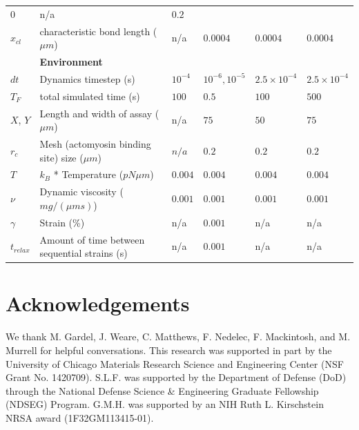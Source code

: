 \documentclass[12pt]{article} \usepackage{times} \usepackage{graphicx}
\begin{document}
\begin{table}
\begin{tabular}{|C{1cm}|L{6cm}|C{2cm}|C{2cm}|C{2cm}|C{2cm}|}
    0 & n/a&$0.2$\\ $x_{cl}$& characteristic bond length ($\mu m$) & n/a &
    $0.0004$ & $0.0004$ & $0.0004$ \\ \hline &\bf{Environment} & & \\ \hline
    $dt$ & Dynamics timestep (s) & $10^{-4}$ & $10^{-6},10^{-5}$
    &$2.5\times10^{-4}$ &$2.5\times10^{-4}$ \\ $T_F$& total simulated time (s)
    & $100$ & $0.5$ & $100$ & $500$ \\ $X$, $Y$ & Length and width of assay
    ($\mu m$)& n/a & $75$ & $50$ & $75$\\ $r_c$ & Mesh (actomyosin binding
    site) size ($\mu m$) & $n/a$ & $0.2 $ & $0.2 $& $0.2 $ \\ $T$ & $k_B$ *
    Temperature ($pN\mu m$)& $0.004$ & $0.004$& $0.004$& $0.004$\\ $\nu$ &
    Dynamic viscosity ($mg/(\mu m s)$) & $0.001$& $0.001$& $0.001$& $0.001$\\
    $\gamma$ & Strain (\%) \cite{stricker2010}& n/a& $0.001$&n/a&n/a\\
    $t_{relax}$ & Amount of time between sequential strains (s)& n/a& $0.001$
    &n/a&n/a\\ \hline \end{tabular} \label{tab:params} \end{table}



\section{Acknowledgements}  We thank M. Gardel, J. Weare, C. Matthews, F.
Nedelec, F. Mackintosh, and M. Murrell for helpful conversations. This research
was supported in part by the University of Chicago Materials Research Science
and Engineering Center (NSF Grant No. 1420709). S.L.F. was supported by the
Department of Defense (DoD) through the National Defense Science \& Engineering
Graduate Fellowship (NDSEG) Program. G.M.H. was supported by an NIH Ruth L.
Kirschstein NRSA award (1F32GM113415-01).  

\end{document}
